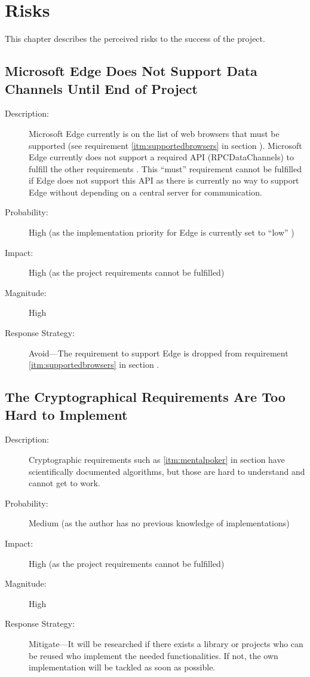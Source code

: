 \chapter{Risks}

This chapter describes the perceived risks to the success of the project.

\section{Microsoft Edge Does Not Support Data Channels Until End of Project}
\label{sec:riskedgedatachannels}

\begin{description}
  \item[Description:] Microsoft Edge currently is on the list of web browsers
  that must be supported (see requirement \ref{itm:supportedbrowsers} in
  section ). Microsoft Edge currently does not support
  a required API (RPCDataChannels) to fulfill the other requirements
  \cite{Microsoft2016datachannels}. This “must” requirement cannot be fulfilled
  if Edge does not support this API as there is currently no way to support
  Edge without depending on a central server for communication.
  \item[Probability:] High (as the implementation priority for Edge is
  currently set to “low” \cite{Microsoft2016datachannels})
  \item[Impact:] High (as the project requirements cannot be fulfilled)
  \item[Magnitude:] High
  \item[Response Strategy:] Avoid---The requirement to support Edge is dropped
  from requirement \ref{itm:supportedbrowsers} in section
  .
\end{description}

\section{The Cryptographical Requirements Are Too Hard to Implement}

\begin{description}
  \item[Description:] Cryptographic requirements such as \ref{itm:mentalpoker}
  in section  have scientifically documented
  algorithms, but those are hard to understand and cannot get to work.
  \item[Probability:] Medium (as the author has no previous knowledge of
  implementations)
  \item[Impact:] High (as the project requirements cannot be fulfilled)
  \item[Magnitude:] High
  \item[Response Strategy:] Mitigate---It will be researched if there exists a
  library or projects who can be reused who implement the needed
  functionalities. If not, the own implementation will be tackled as soon as
  possible.
\end{description}

